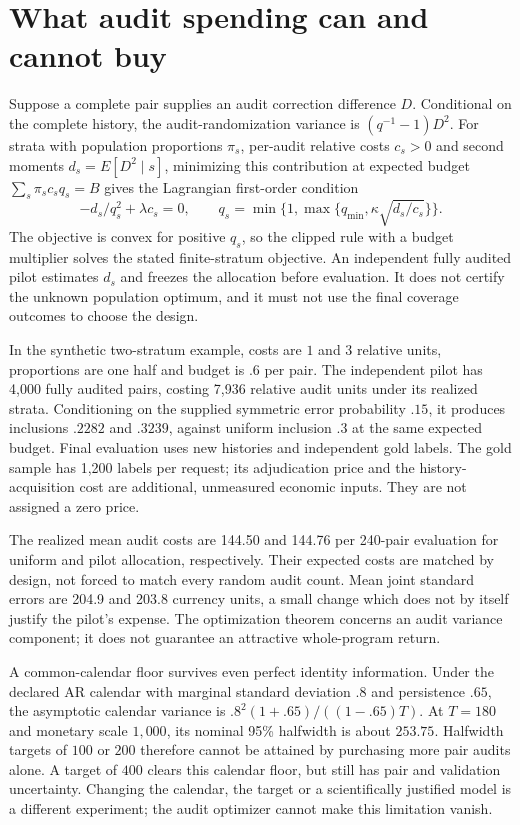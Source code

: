 \section{What audit spending can and cannot buy}
\label{r8:audit-design}

Suppose a complete pair supplies an audit correction difference $D$. Conditional
on the complete history, the audit-randomization variance is
$(q^{-1}-1)D^2$. For strata with population proportions $\pi_s$, per-audit
relative costs $c_s>0$ and second moments $d_s=E[D^2\mid s]$, minimizing this
contribution at expected budget $\sum_s\pi_sc_sq_s=B$ gives the Lagrangian
first-order condition
\[
 -d_s/q_s^2+\lambda c_s=0,\qquad
 q_s=\min\{1,\max\{q_{\min},\kappa\sqrt{d_s/c_s}\}\}.
\]
The objective is convex for positive $q_s$, so the clipped rule with a budget
multiplier solves the stated finite-stratum objective. An independent fully
audited pilot estimates $d_s$ and freezes the allocation before evaluation.
It does not certify the unknown population optimum, and it must not use the
final coverage outcomes to choose the design.

In the synthetic two-stratum example, costs are $1$ and $3$ relative units,
proportions are one half and budget is $.6$ per pair. The independent pilot has
4,000 fully audited pairs, costing 7,936 relative audit units under its realized
strata. Conditioning on the supplied symmetric error probability $.15$, it
produces inclusions $.2282$ and $.3239$, against uniform inclusion $.3$ at the
same expected budget. Final evaluation uses new histories and independent
gold labels. The gold sample has 1,200 labels per request; its adjudication
price and the history-acquisition cost are additional, unmeasured economic
inputs. They are not assigned a zero price.

The realized mean audit costs are 144.50 and 144.76 per 240-pair evaluation for
uniform and pilot allocation, respectively. Their expected costs are matched
by design, not forced to match every random audit count. Mean joint standard
errors are 204.9 and 203.8 currency units, a small change which does not by
itself justify the pilot's expense. The optimization theorem concerns an audit
variance component; it does not guarantee an attractive whole-program return.

A common-calendar floor survives even perfect identity information. Under the
declared AR calendar with marginal standard deviation $.8$ and persistence $.65$,
the asymptotic calendar variance is
$.8^2(1+.65)/((1-.65)T)$. At $T=180$ and monetary scale $1,000$, its nominal
95\% halfwidth is about $253.75$. Halfwidth targets of $100$ or $200$ therefore
cannot be attained by purchasing more pair audits alone. A target of $400$
clears this calendar floor, but still has pair and validation uncertainty.
Changing the calendar, the target or a scientifically justified model is a
different experiment; the audit optimizer cannot make this limitation vanish.

